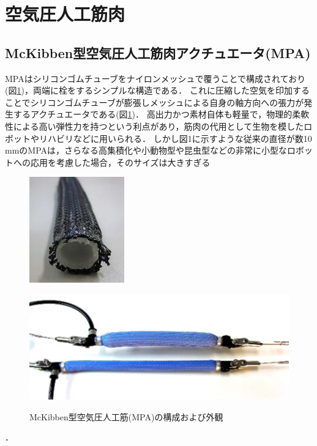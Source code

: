 \newpage
\section{空気圧人工筋肉}
\subsection{McKibben型空気圧人工筋肉アクチュエータ(MPA)}
MPAはシリコンゴムチューブをナイロンメッシュで覆うことで構成されており(図\ref{fig:MPA})，両端に栓をするシンプルな構造である．
これに圧縮した空気を印加することでシリコンゴムチューブが膨張しメッシュによる自身の軸方向への張力が発生するアクチュエータである(図\ref{fig:MPA})．
高出力かつ素材自体も軽量で，物理的柔軟性による高い弾性力を持つという利点があり，筋肉の代用として生物を模したロボットやリハビリなどに用いられる．
しかし図1に示すような従来の直径が数10 mmのMPAは，さらなる高集積化や小動物型や昆虫型などの非常に小型なロボットへの応用を考慮した場合，そのサイズは大きすぎる
\begin{figure}[b]
    \begin{minipage}{0.49\columnwidth}
      \vspace{4mm}
      \centering
      \includegraphics[scale=1]{pic/MPA_kousei.png}
      \vspace{3mm}
      \label{fig:Structure}
    \end{minipage}
    \begin{minipage}{0.49\columnwidth}
      \vspace{25mm}
      \centering
      \includegraphics[scale=.8]{pic/MPA_dousa.png}
      \label{fig:move}
    \end{minipage}
    \caption{McKibben型空気圧人工筋(MPA)の構成および外観\cite{中西大輔2020}}
    \label{fig:MPA}
  \end{figure}．
